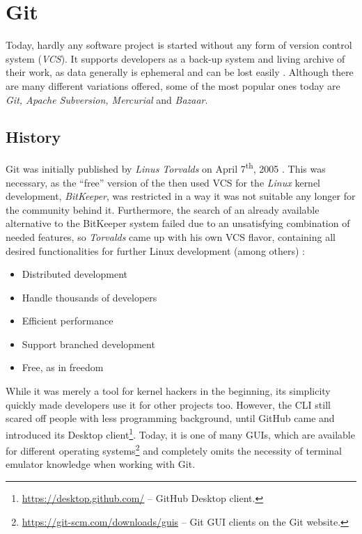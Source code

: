 \section{Git}
\label{sec:git}

Today, hardly any software project is started without any form of version control system (\emph{VCS}). It supports developers as a back-up system and living archive of their work, as data generally is ephemeral and can be lost easily \cite[1]{loeliger2012version}. Although there are many different variations offered, some of the most popular ones today are \emph{Git, Apache Subversion, Mercurial} and \emph{Bazaar}.

\subsection{History}
\label{sec:git-history}
Git was initially published by \emph{Linus Torvalds} on April 7\textsuperscript{th}, 2005 \cite[6]{loeliger2012version}. This was necessary, as the ``free'' version of the then used VCS for the \emph{Linux} kernel development, \emph{BitKeeper}, was restricted in a way it was not suitable any longer for the community behind it. Furthermore, the search of an already available alternative to the BitKeeper system failed due to an unsatisfying combination of needed features, so \emph{Torvalds} came up with his own VCS flavor, containing all desired functionalities for further Linux development (among others) \cite[4]{loeliger2012version}:

\begin{itemize}
  \item Distributed development
  \item Handle thousands of developers
  \item Efficient performance
  \item Support branched development
  \item Free, as in freedom
\end{itemize}

While it was merely a tool for kernel hackers in the beginning, its simplicity quickly made developers use it for other projects too. However, the CLI still scared off people with less programming background, until GitHub came and introduced its Desktop client\footnote{\url{https://desktop.github.com/} -- GitHub Desktop client.}. Today, it is one of many GUIs, which are available for different operating systems\footnote{\url{https://git-scm.com/downloads/guis} -- Git GUI clients on the Git website.} and completely omits the necessity of terminal emulator knowledge when working with Git.

